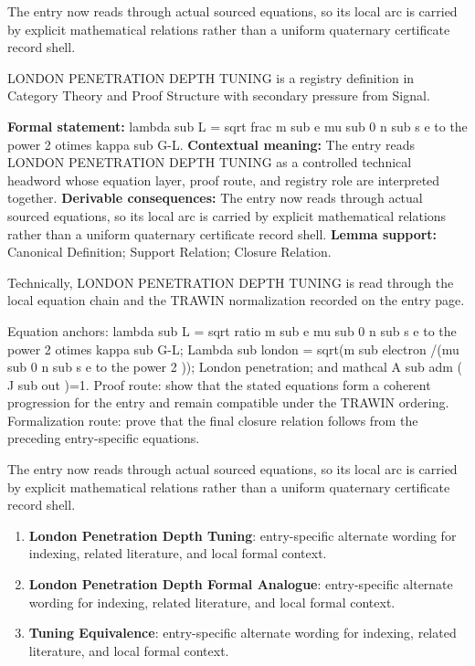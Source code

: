 The entry now reads through actual sourced equations, so its local arc is carried by explicit mathematical relations rather than a uniform quaternary certificate record shell.
\clearpage


\begingroup\small
{}
LONDON PENETRATION DEPTH TUNING is a registry definition in Category Theory and Proof Structure with secondary pressure from Signal.

\begingroup\footnotesize\setlength{\emergencystretch}{3em}\sloppy
\textbf{Formal statement:} lambda sub L = sqrt frac m sub e mu sub 0 n sub s e to the power 2 otimes kappa sub G-L. \textbf{Contextual meaning:} The entry reads LONDON PENETRATION DEPTH TUNING as a controlled technical headword whose equation layer, proof route, and registry role are interpreted together. \textbf{Derivable consequences:} The entry now reads through actual sourced equations, so its local arc is carried by explicit mathematical relations rather than a uniform quaternary certificate record shell. \textbf{Lemma support:} Canonical Definition; Support Relation; Closure Relation.\par
\endgroup

Technically, LONDON PENETRATION DEPTH TUNING is read through the local equation chain and the TRAWIN normalization recorded on the entry page.

Equation anchors: lambda sub L = sqrt ratio m sub e mu sub 0 n sub s e to the power 2 otimes kappa sub G-L; Lambda sub london = sqrt(m sub electron /(mu sub 0 n sub s e to the power 2 )); London penetration; and mathcal A sub adm ( J sub out )=1. Proof route: show that the stated equations form a coherent progression for the entry and remain compatible under the TRAWIN ordering. Formalization route: prove that the final closure relation follows from the preceding entry-specific equations.

The entry now reads through actual sourced equations, so its local arc is carried by explicit mathematical relations rather than a uniform quaternary certificate record shell.
\endgroup

\begin{enumerate}[leftmargin=1.6em,itemsep=6pt,topsep=4pt]
\item \textbf{London Penetration Depth Tuning}: entry-specific alternate wording for indexing, related literature, and local formal context.
\item \textbf{London Penetration Depth Formal Analogue}: entry-specific alternate wording for indexing, related literature, and local formal context.
\item \textbf{Tuning Equivalence}: entry-specific alternate wording for indexing, related literature, and local formal context.
\end{enumerate}

